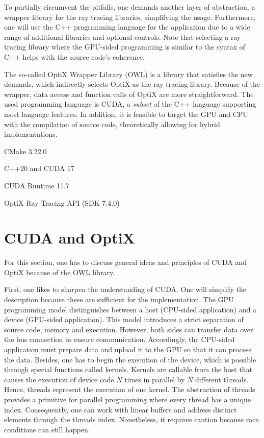 To partially circumvent the pitfalls, one demands another layer of abstraction, a wrapper library for the ray tracing libraries, simplifying the usage.
Furthermore, one will use the C++ programming language for the application due to a wide range of additional libraries and optional controls.
Note that selecting a ray tracing library where the GPU-sided programming is similar to the syntax of C++ helps with the source code's coherence.

The so-called OptiX Wrapper Library (OWL) is a library that satisfies the new demands, which indirectly selects OptiX as the ray tracing library.
Because of the wrapper, data access and function calls of OptiX are more straightforward.
The used programming language is CUDA, a \textit{subset} of the C++ language supporting most language features.
In addition, it is feasible to target the GPU and CPU with the compilation of source code, theoretically allowing for hybrid implementations.

\begin{list}{-}{}
    \item CMake 3.22.0
    \item C++20 and CUDA 17
    \item CUDA Runtime 11.7
    \item OptiX Ray Tracing API (SDK 7.4.0)
\end{list}

\section{CUDA and OptiX}

For this section, one has to discuss general ideas and principles of CUDA and OptiX because of the OWL library.

First, one likes to sharpen the understanding of CUDA.
One will simplify the description because these are sufficient for the implementation.
The GPU programming model \cite{nvidia_cuda_2022} distinguishes between a host (CPU-sided application) and a device (GPU-sided application).
This model introduces a strict separation of source code, memory and execution.
However, both sides can transfer data over the bus connection to ensure communication.
Accordingly, the CPU-sided application must prepare data and upload it to the GPU so that it can process the data.
Besides, one has to begin the execution of the device, which is possible through special functions called kernels.
Kernels are callable from the host that causes the execution of device code $N$ times in parallel by $N$ different threads.
Hence, threads represent the execution of one kernel.
The abstraction of threads provides a primitive for parallel programming where every thread has a unique index.
Consequently, one can work with linear buffers and address distinct elements through the threads index.
Nonetheless, it requires caution because race conditions can still happen.

